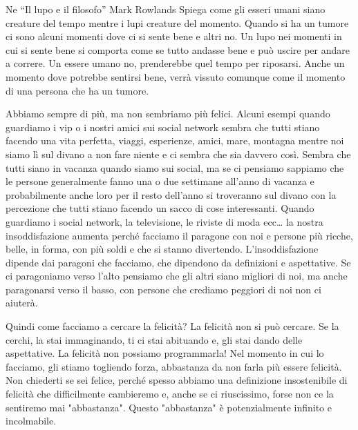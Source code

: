 \documentclass[12pt]{book} %
\begin{document}
\begin{mdframed}[linewidth=1pt]
Ne “Il lupo e il filosofo” Mark
Rowlands Spiega come gli esseri umani siano creature del tempo mentre i lupi creature del momento. Quando si ha un
tumore ci sono alcuni momenti dove ci si sente bene e altri no. Un lupo nei momenti in cui si sente bene si comporta
come se tutto andasse bene e può uscire per andare a correre. Un essere umano no, prenderebbe quel tempo per riposarsi.
Anche un momento dove potrebbe sentirsi bene, verrà vissuto comunque come il momento di una persona che ha un tumore.
\end{mdframed}

Abbiamo sempre di più, ma non sembriamo più felici. Alcuni esempi quando guardiamo i vip o i nostri amici sui
social network sembra che tutti stiano facendo una vita perfetta, viaggi, esperienze, amici, mare, montagna mentre noi
siamo lì sul divano a non fare niente e ci sembra che sia davvero così. Sembra che tutti siano in vacanza quando siamo sui social, ma se
ci pensiamo sappiamo che le persone generalmente fanno una o due settimane all'anno di vacanza e
probabilmente anche loro per il resto dell'anno si troveranno sul divano con la percezione che
tutti stiano facendo un sacco di cose interessanti. Quando guardiamo i social network, la
televisione, le riviste di moda ecc… la nostra insoddisfazione aumenta perché facciamo il paragone con noi e persone
più ricche, belle, in forma, con più soldi e che si stanno divertendo. L'insoddisfazione dipende dai paragoni che
facciamo, che dipendono da definizioni e aspettative. Se ci paragoniamo verso l'alto pensiamo che gli altri siano
migliori di noi, ma anche paragonarsi verso il basso, con persone che crediamo peggiori di noi non ci aiuterà.

Quindi come facciamo a cercare la felicità? 
La felicità non si può cercare. Se la cerchi, la stai immaginando, ti ci stai abituando e, gli stai dando delle
aspettative. La felicità non possiamo programmarla! Nel momento in cui lo facciamo, gli stiamo togliendo forza, abbastanza da non farla più essere felicità. Non chiederti se sei felice, perché spesso abbiamo una definizione insostenibile di felicità che difficilmente cambieremo e, anche se ci riuscissimo, forse non ce la sentiremo mai "abbastanza". Questo "abbastanza" è potenzialmente infinito e incolmabile. 
\end{document}
